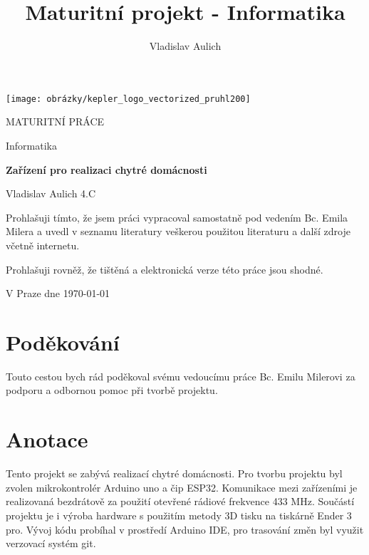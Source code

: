 \documentclass[a4paper,titlepage]{article}
\title{Maturitní projekt - Informatika}
\author{Vladislav Aulich}
\begin{document}
\pagestyle{empty}
\begin{center}
	\begin{center}
		\texttt{[image: obrázky/kepler\_logo\_vectorized\_pruhl200]}
	\end{center}
	
	\huge{MATURITNÍ PRÁCE
		\vspace{0.5 cm}
		
		Informatika
		
		\vspace{2.5 cm}
		\textbf{Zařízení pro realizaci chytré domácnosti} }  
\end{center} 

\vspace{2.5 cm}
\Large{
	Vladislav Aulich 4.C
	
	\clearpage  
	
\vspace*{12 cm}

Prohlašuji tímto, že jsem  práci vypracoval samostatně pod vedením Bc. Emila Milera a uvedl v seznamu literatury veškerou použitou literaturu a další zdroje včetně internetu.

Prohlašuji rovněž, že tištěná a elektronická verze této práce jsou shodné.

V Praze dne \today            

\hspace{6.5cm} \makebox[2in]{\hrulefill}

\hspace{6.5cm}     


\clearpage
\section*{Poděkování}

Touto cestou bych rád poděkoval svému vedoucímu práce Bc. Emilu Milerovi za podporu a odbornou pomoc při tvorbě projektu.
\clearpage

\section*{Anotace}

Tento projekt se zabývá realizací chytré domácnosti. Pro tvorbu projektu byl zvolen mikrokontrolér Arduino uno a čip ESP32. Komunikace mezi zařízeními je realizovaná bezdrátově za použití otevřené rádiové frekvence 433 MHz. Součástí projektu je i výroba hardware s použitím metody 3D tisku na tiskárně Ender 3 pro. Vývoj kódu probíhal v prostředí Arduino IDE, pro trasování změn byl využit verzovací systém git.

}
\end{document}
